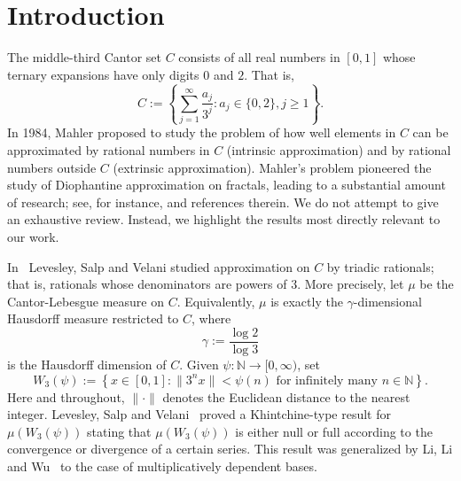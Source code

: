 \documentclass[amssymb,amsfonts,refcheck,12pt,verbatim,righttag]{amsart}
\numberwithin{equation}{section} %
\newcommand{\N}{\mathbb{N}}
\theoremstyle{plain}
\begin{document}
\maketitle


\section{Introduction}


 The middle-third Cantor set $C$ consists of all real numbers in $[0,1]$ whose ternary expansions  have only  digits $0$ and $2$. That is,
\begin{equation*}
	C:=\left\{\sum_{j=1}^{\infty}\frac{a_j}{3^j}: a_j\in \{0,2\}, j\geq 1\right\}.
\end{equation*}
In 1984,  Mahler \cite{Mahler84} proposed to study the problem of how well  elements in $C$ can  be
approximated by rational numbers in $C$ (intrinsic approximation) and by rational numbers outside  $C$ (extrinsic approximation). Mahler's problem pioneered the study of Diophantine approximation on fractals, leading to a substantial amount of research; see, for instance, \cite{LSV07O,BD16M,Schleischitz21,TWW24M,Baker25A,CVY24C,CU25S,BHZ24K} and references therein. We do not attempt to give an exhaustive review. Instead, we highlight the results most directly relevant to our work.

In~\cite{LSV07O} Levesley, Salp and Velani studied approximation on $C$ by triadic rationals; that is, rationals whose  denominators  are powers of $3$.  More precisely, let $\mu$ be the  Cantor-Lebesgue measure on $C$. Equivalently, $\mu$ is exactly the $\gamma$-dimensional Hausdorff measure restricted to $C$, where 
\[\gamma:=\frac{\log2}{\log3}\]
is the Hausdorff dimension of $C$. Given $\psi: \N\to [0,\infty)$, set 
\[W_3(\psi):=\left\{x\in [0,1]: \|3^nx\|<\psi(n)\text{ for infinitely many   }n\in\N\right\}.\]
Here and throughout,  $\|\cdot\|$ denotes  the Euclidean distance to the nearest integer.   Levesley, Salp and Velani~\cite{LSV07O} proved a Khintchine-type result for $\mu(W_3(\psi))$ stating that $\mu(W_3(\psi))$ is either null or full according to the convergence or divergence of a certain series.  This result was generalized by Li, Li and Wu~\cite{LLW25Z} to the case of multiplicatively dependent bases.
\end{document}
